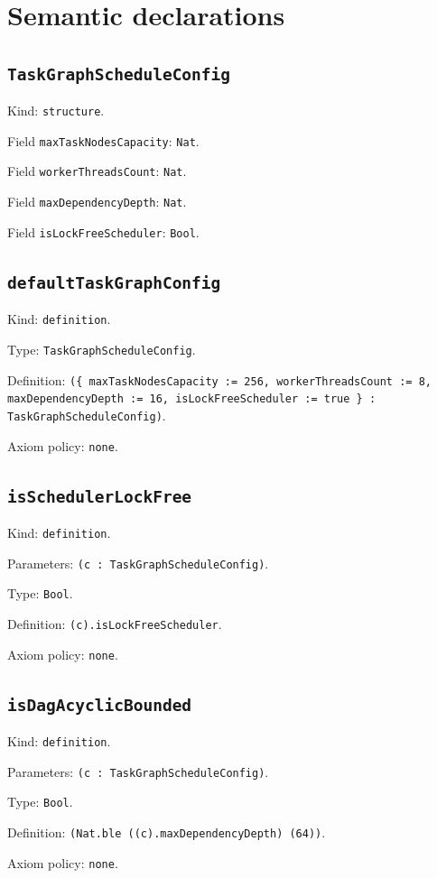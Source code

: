 \documentclass[11pt]{article}
\begin{document}
\section*{Semantic declarations}
\subsection*{\texttt{TaskGraphScheduleConfig}}
\noindent Kind: \texttt{structure}.\par
\noindent Field \texttt{maxTaskNodesCapacity}: \texttt{Nat}.\par
\noindent Field \texttt{workerThreadsCount}: \texttt{Nat}.\par
\noindent Field \texttt{maxDependencyDepth}: \texttt{Nat}.\par
\noindent Field \texttt{isLockFreeScheduler}: \texttt{Bool}.\par
\subsection*{\texttt{defaultTaskGraphConfig}}
\noindent Kind: \texttt{definition}.\par
\noindent Type: \texttt{TaskGraphScheduleConfig}.\par
\noindent Definition: \texttt{(\{ maxTaskNodesCapacity := 256, workerThreadsCount := 8, maxDependencyDepth := 16, isLockFreeScheduler := true \} : TaskGraphScheduleConfig)}.\par
\noindent Axiom policy: \texttt{none}.\par
\subsection*{\texttt{isSchedulerLockFree}}
\noindent Kind: \texttt{definition}.\par
\noindent Parameters: \texttt{(c : TaskGraphScheduleConfig)}.\par
\noindent Type: \texttt{Bool}.\par
\noindent Definition: \texttt{(c).isLockFreeScheduler}.\par
\noindent Axiom policy: \texttt{none}.\par
\subsection*{\texttt{isDagAcyclicBounded}}
\noindent Kind: \texttt{definition}.\par
\noindent Parameters: \texttt{(c : TaskGraphScheduleConfig)}.\par
\noindent Type: \texttt{Bool}.\par
\noindent Definition: \texttt{(Nat.ble ((c).maxDependencyDepth) (64))}.\par
\noindent Axiom policy: \texttt{none}.\par
\end{document}
